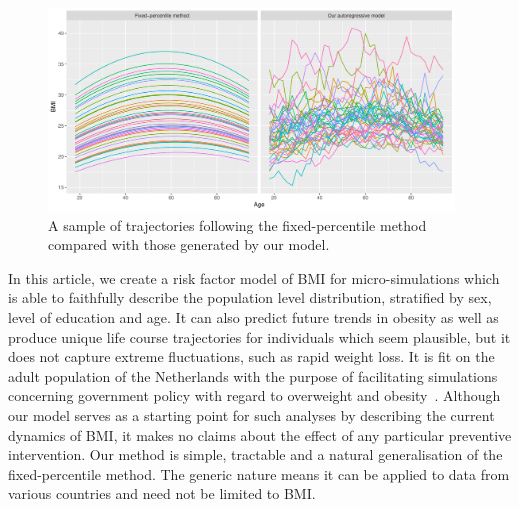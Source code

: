 \documentclass{imammb}
\numberwithin{equation}{section}
\begin{document}
\vspace{-4mm}

\begin{figure}[!h]
\centering
\includegraphics[width=0.96\textwidth] {"Figures/Individual-Trajectories.pdf"}
\vspace*{-2pt}
\caption{A sample of trajectories following the fixed-percentile method compared with those generated by our model.}
\label{fig:Individual Trajectories}
\vspace*{-9pt}
\end{figure}

\vspace{1mm}

In this article, we create a risk factor model of BMI for micro-simulations which is able to faithfully describe the population level distribution, stratified by sex, level of education and age. It can also predict future trends in obesity as well as produce unique life course trajectories for individuals which seem plausible, but it does not capture extreme fluctuations, such as rapid weight loss. It is fit on the adult population of the Netherlands with the purpose of facilitating simulations concerning government policy with regard to overweight and obesity~\citep{TenDam2023}. Although our model serves as a starting point for such analyses by describing the current dynamics of BMI, it makes no claims about the effect of any particular preventive intervention. Our method is simple, tractable and a natural generalisation of the fixed-percentile method. The generic nature means it can be applied to data from various countries and need not be limited to BMI.
\end{document}

